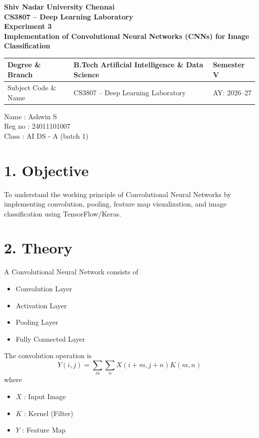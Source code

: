 \documentclass[11pt]{article}
\begin{document}
\begin{center}
{\Large\textbf{Shiv Nadar University Chennai}}\\
\textbf{CS3807 -- Deep Learning Laboratory}\\
\textbf{Experiment 3}\\
{\large\textbf{Implementation of Convolutional Neural Networks (CNNs) for Image Classification}}
\end{center}

\renewcommand{\arraystretch}{1.25}

\begin{tabular}{|p{3.8cm}|p{8cm}|p{2cm}|}
\hline
Degree \& Branch & B.Tech Artificial Intelligence \& Data Science & Semester V\\ \hline
Subject Code \& Name & CS3807 -- Deep Learning Laboratory & AY: 2026--27\\ \hline
\end{tabular}

\vspace{4mm}
Name : Ashwin S\\
Reg no : 24011101007\\
Class : AI DS - A (batch 1)\\

\vspace{6mm}
\section*{1. Objective}
To understand the working principle of Convolutional Neural Networks by implementing convolution, pooling, feature map visualization, and image classification using TensorFlow/Keras.

\vspace{6mm}
\section*{2. Theory}
A Convolutional Neural Network consists of

\begin{itemize}
\item Convolution Layer
\item Activation Layer
\item Pooling Layer
\item Fully Connected Layer
\end{itemize}

The convolution operation is
\[
Y(i,j)=\sum_m\sum_n X(i+m,j+n)K(m,n)
\]
where

\begin{itemize}
\item $X$ : Input Image
\item $K$ : Kernel (Filter)
\item $Y$ : Feature Map
\end{itemize}
\end{document}
